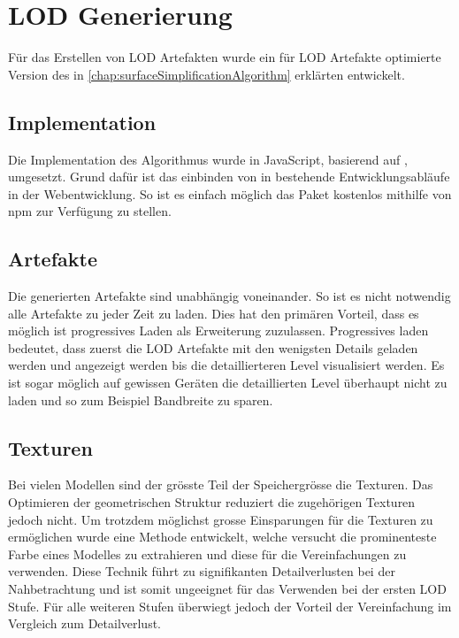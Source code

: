 \section{LOD Generierung}

Für das Erstellen von LOD Artefakten wurde ein für LOD Artefakte optimierte Version des in \autoref{chap:surfaceSimplificationAlgorithm} erklärten  entwickelt.

\subsection{Implementation}

Die Implementation des Algorithmus wurde in JavaScript, basierend auf , umgesetzt. Grund dafür ist das einbinden von  in bestehende Entwicklungsabläufe in der Webentwicklung. So ist es einfach möglich das Paket kostenlos mithilfe von \gls{npm} zur Verfügung zu stellen.

\subsection{Artefakte}

Die generierten Artefakte sind unabhängig voneinander. So ist es nicht notwendig alle Artefakte zu jeder Zeit zu laden. Dies hat den primären Vorteil, dass es möglich ist progressives Laden als Erweiterung zuzulassen. Progressives laden bedeutet, dass zuerst die LOD Artefakte mit den wenigsten Details geladen werden und angezeigt werden bis die detaillierteren Level visualisiert werden.
Es ist sogar möglich auf gewissen Geräten die detaillierten Level überhaupt nicht zu laden und so zum Beispiel Bandbreite zu sparen.

\subsection{Texturen}

Bei vielen Modellen sind der grösste Teil der Speichergrösse die Texturen. Das Optimieren der geometrischen Struktur reduziert die zugehörigen Texturen jedoch nicht. Um trotzdem möglichst grosse Einsparungen für die Texturen zu ermöglichen wurde eine Methode entwickelt, welche versucht die prominenteste Farbe eines Modelles zu extrahieren und diese für die Vereinfachungen zu verwenden.
Diese Technik führt zu signifikanten Detailverlusten bei der Nahbetrachtung und ist somit ungeeignet für das Verwenden bei der ersten LOD Stufe. Für alle weiteren Stufen überwiegt jedoch der Vorteil der Vereinfachung im Vergleich zum Detailverlust.

